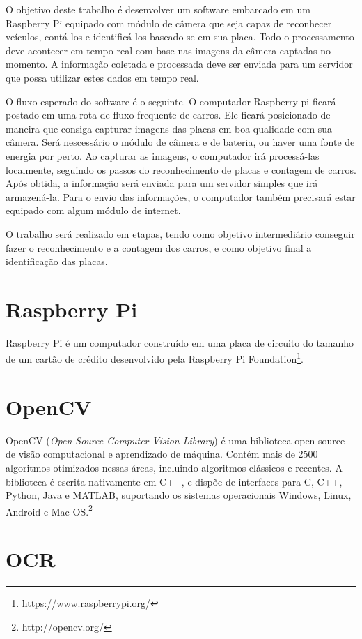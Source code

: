 O objetivo deste trabalho é desenvolver um software embarcado em um Raspberry Pi
equipado com módulo de câmera que seja capaz de reconhecer veículos, contá-los e
identificá-los baseado-se em sua placa. Todo o processamento deve acontecer em
tempo real com base nas imagens da câmera captadas no momento. A informação
coletada e processada deve ser enviada para um servidor que possa utilizar estes
dados em tempo real.

O fluxo esperado do software é o seguinte. O computador Raspberry pi ficará
postado em uma rota de fluxo frequente de carros. Ele ficará posicionado de
maneira que consiga capturar imagens das placas em boa qualidade com sua câmera.
Será nescessário o módulo de câmera e de bateria, ou haver uma fonte de energia
por perto. Ao capturar as imagens, o computador irá processá-las localmente,
seguindo os passos do reconhecimento de placas e contagem de carros.  Após
obtida, a informação será enviada para um servidor simples que irá armazená-la.
Para o envio das informações, o computador também precisará estar equipado com
algum módulo de internet.

O trabalho será realizado em etapas, tendo como objetivo intermediário conseguir
fazer o reconhecimento e a contagem dos carros, e como objetivo final a
identificação das placas.

\section{Raspberry Pi}
\label{sec:raspi}

Raspberry Pi é um computador construído em uma placa de circuito do tamanho de
um cartão de crédito desenvolvido pela Raspberry Pi
Foundation\footnote{https://www.raspberrypi.org/}.

\section{OpenCV}
\label{sec:opencv}

OpenCV (\emph{Open Source Computer Vision Library}) é uma biblioteca open source
de visão computacional e aprendizado de máquina. Contém mais de 2500 algoritmos
otimizados nessas áreas, incluindo algoritmos clássicos e recentes. A biblioteca
é escrita nativamente em C++, e dispõe de interfaces para C, C++, Python, Java e
MATLAB, suportando os sistemas operacionais Windows, Linux, Android e Mac
OS.\footnote{http://opencv.org/}

\section{OCR}
\label{sec:ocr}

